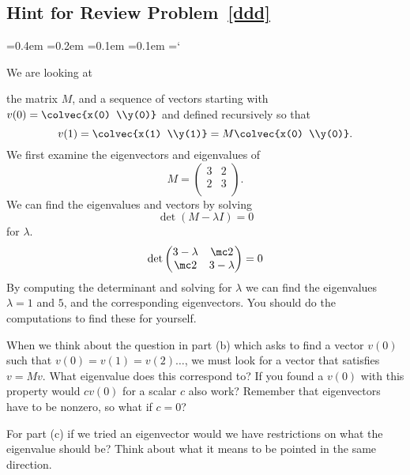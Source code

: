 
\subsection*{Hint for Review Problem~\ref{ddd}}

{\ttfamily
{}\font=0.4em
\font=0.2em
\font=0.1em
\font=0.1em
\hyphenchar\font=`\-


\hypertarget{scripts_eigenvalues_and_eigenvectors_ii_hint}{ We are looking at} the matrix $M$, and a sequence of vectors starting with $v(0) = \colvec{x(0) \\y(0)}$ and defined recursively so that 
\[v(1) = \colvec{x(1) \\y(1)} = M\colvec{x(0) \\y(0)}.\] We first examine the eigenvectors and eigenvalues of 
\[M=
\begin{pmatrix}
3 & 2 \\
2 &3 \\
\end{pmatrix}.\]
We can find the eigenvalues and vectors by solving \[\det (M - \lambda I) = 0\] for $\lambda$.
\[
\det \begin{pmatrix}
3 -\lambda & \mc2 \\
\mc2 & 3 -\lambda \\
\end{pmatrix}
= 0
\]
By computing the determinant and solving for $\lambda$ we can find the eigenvalues $\lambda = 1$ and $5$, and the corresponding eigenvectors. You should do the computations to find these for yourself. 

When we think about the question in part (b) which asks  to find a vector $v(0)$ such that $ v(0) = v(1) =v(2) \ldots$, we must look for a vector that satisfies $v = M v$. What eigenvalue does this correspond to? If you found a $v(0)$ with this property would $c v(0)$ for a scalar $c$ also work? Remember that eigenvectors have to be nonzero, so what if $c=0$?

For part (c) if we tried an eigenvector would we have restrictions on what the eigenvalue should be? Think about what it means to be pointed in the same direction.
} %

